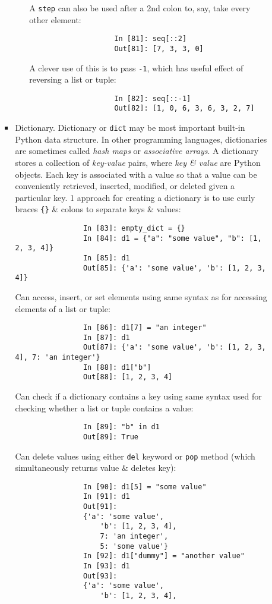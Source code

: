 \documentclass{article}
\begin{document}
\begin{itemize}
\begin{itemize}
\begin{itemize}
\begin{itemize}
				A {\tt step} can also be used after a 2nd colon to, say, take every other element:
				\begin{verbatim}
					In [81]: seq[::2]
					Out[81]: [7, 3, 3, 0]
				\end{verbatim}
				A clever use of this is to pass {\tt-1}, which has useful effect of reversing a list or tuple:
				\begin{verbatim}
					In [82]: seq[::-1]
					Out[82]: [1, 0, 6, 3, 6, 3, 2, 7]
				\end{verbatim}
			\end{itemize}
			\item {\sf Dictionary.} Dictionary or {\tt dict} may be most important built-in Python data structure. In other programming languages, dictionaries are sometimes called {\it hash maps} or {\it associative arrays}. A dictionary stores a collection of {\it key-value} pairs, where {\it key \& value} are Python objects. Each key is associated with a value so that a value can be conveniently retrieved, inserted, modified, or deleted given a particular key. 1 approach for creating a dictionary is to use curly braces \verb|{}| \& colons to separate keys \& values:
			\begin{verbatim}
				In [83]: empty_dict = {}
				In [84]: d1 = {"a": "some value", "b": [1, 2, 3, 4]}
				In [85]: d1
				Out[85]: {'a': 'some value', 'b': [1, 2, 3, 4]}
			\end{verbatim}
			Can access, insert, or set elements using same syntax as for accessing elements of a list or tuple:
			\begin{verbatim}
				In [86]: d1[7] = "an integer"
				In [87]: d1
				Out[87]: {'a': 'some value', 'b': [1, 2, 3, 4], 7: 'an integer'}
				In [88]: d1["b"]
				Out[88]: [1, 2, 3, 4]
			\end{verbatim}
			Can check if a dictionary contains a key using same syntax used for checking whether a list or tuple contains a value:
			\begin{verbatim}
				In [89]: "b" in d1
				Out[89]: True
			\end{verbatim}
			Can delete values using either {\tt del} keyword or {\tt pop} method (which simultaneously returns value \& deletes key):
			\begin{verbatim}
				In [90]: d1[5] = "some value"
				In [91]: d1
				Out[91]:
				{'a': 'some value',
					'b': [1, 2, 3, 4],
					7: 'an integer',
					5: 'some value'}
				In [92]: d1["dummy"] = "another value"
				In [93]: d1
				Out[93]:
				{'a': 'some value',
					'b': [1, 2, 3, 4],

\end{verbatim}
\end{itemize}
\end{itemize}
\end{itemize}
\end{document}
